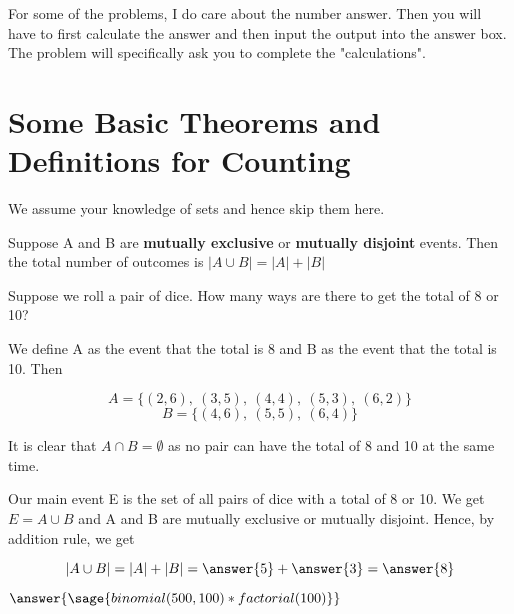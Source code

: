 \documentclass{ximera}
\begin{document}
\hspace{1cm}

For some of the problems, I do care about the number answer. Then you will have to first calculate the answer and then input the output into the answer box. The problem will specifically ask you to complete the "calculations".

\section*{Some Basic Theorems and Definitions for Counting}

We assume your knowledge of sets and hence skip them here.

\begin{theorem}
Suppose A and B are \textbf{mutually exclusive} or \textbf{mutually disjoint}  events. Then the total number of outcomes is $|A\cup B|=|A|+|B|$
\end{theorem}

\begin{example}
Suppose we roll a pair of dice. How many ways are there to get the total of 8 or 10?

\begin{explanation}
We define A as the event that the total is 8 and B as the event that the total is 10. Then 

$$A=\{(2,6),~(3,5),~(4,4),~(5,3),~(6,2)\}$$
$$B=\{(4,6),~(5,5),~(6,4)\}$$

It is clear that $A\cap B=\emptyset$ as no pair can have the total of 8 and 10 at the same time.

Our main event E is the set of all pairs of dice with a total of 8 or 10. We get $E=A\cup B$ and A and B are mutually exclusive or mutually disjoint. Hence, by addition rule, we get

$$|A\cup B|=|A|+|B|=\answer{5}+\answer{3}=\answer{8}$$


\end{explanation}
\end{example}





\begin{problem}
$\answer{\sage{binomial(500,100)*factorial(100)}}$
\end{problem}
\end{document}
